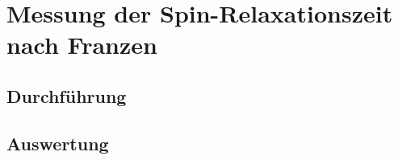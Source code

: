 \section{Messung der Spin-Relaxationszeit nach Franzen}
\subsection{Durchführung}
\subsection{Auswertung}